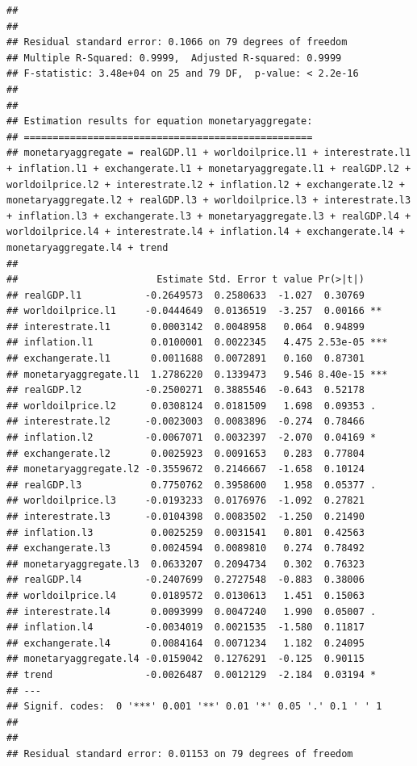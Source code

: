 \documentclass[11pt,preprint, authoryear]{elsarticle}
\numberwithin{equation}{section}
\numberwithin{figure}{section}
\numberwithin{table}{section}
\begin{document}
\begin{verbatim}
## 
## 
## Residual standard error: 0.1066 on 79 degrees of freedom
## Multiple R-Squared: 0.9999,  Adjusted R-squared: 0.9999 
## F-statistic: 3.48e+04 on 25 and 79 DF,  p-value: < 2.2e-16 
## 
## 
## Estimation results for equation monetaryaggregate: 
## ================================================== 
## monetaryaggregate = realGDP.l1 + worldoilprice.l1 + interestrate.l1 + inflation.l1 + exchangerate.l1 + monetaryaggregate.l1 + realGDP.l2 + worldoilprice.l2 + interestrate.l2 + inflation.l2 + exchangerate.l2 + monetaryaggregate.l2 + realGDP.l3 + worldoilprice.l3 + interestrate.l3 + inflation.l3 + exchangerate.l3 + monetaryaggregate.l3 + realGDP.l4 + worldoilprice.l4 + interestrate.l4 + inflation.l4 + exchangerate.l4 + monetaryaggregate.l4 + trend 
## 
##                        Estimate Std. Error t value Pr(>|t|)    
## realGDP.l1           -0.2649573  0.2580633  -1.027  0.30769    
## worldoilprice.l1     -0.0444649  0.0136519  -3.257  0.00166 ** 
## interestrate.l1       0.0003142  0.0048958   0.064  0.94899    
## inflation.l1          0.0100001  0.0022345   4.475 2.53e-05 ***
## exchangerate.l1       0.0011688  0.0072891   0.160  0.87301    
## monetaryaggregate.l1  1.2786220  0.1339473   9.546 8.40e-15 ***
## realGDP.l2           -0.2500271  0.3885546  -0.643  0.52178    
## worldoilprice.l2      0.0308124  0.0181509   1.698  0.09353 .  
## interestrate.l2      -0.0023003  0.0083896  -0.274  0.78466    
## inflation.l2         -0.0067071  0.0032397  -2.070  0.04169 *  
## exchangerate.l2       0.0025923  0.0091653   0.283  0.77804    
## monetaryaggregate.l2 -0.3559672  0.2146667  -1.658  0.10124    
## realGDP.l3            0.7750762  0.3958600   1.958  0.05377 .  
## worldoilprice.l3     -0.0193233  0.0176976  -1.092  0.27821    
## interestrate.l3      -0.0104398  0.0083502  -1.250  0.21490    
## inflation.l3          0.0025259  0.0031541   0.801  0.42563    
## exchangerate.l3       0.0024594  0.0089810   0.274  0.78492    
## monetaryaggregate.l3  0.0633207  0.2094734   0.302  0.76323    
## realGDP.l4           -0.2407699  0.2727548  -0.883  0.38006    
## worldoilprice.l4      0.0189572  0.0130613   1.451  0.15063    
## interestrate.l4       0.0093999  0.0047240   1.990  0.05007 .  
## inflation.l4         -0.0034019  0.0021535  -1.580  0.11817    
## exchangerate.l4       0.0084164  0.0071234   1.182  0.24095    
## monetaryaggregate.l4 -0.0159042  0.1276291  -0.125  0.90115    
## trend                -0.0026487  0.0012129  -2.184  0.03194 *  
## ---
## Signif. codes:  0 '***' 0.001 '**' 0.01 '*' 0.05 '.' 0.1 ' ' 1
## 
## 
## Residual standard error: 0.01153 on 79 degrees of freedom

\end{verbatim}
\end{document}

